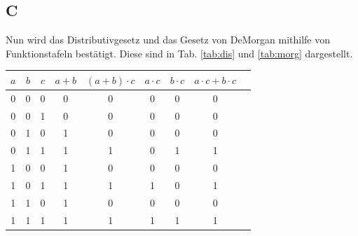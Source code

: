 \documentclass[10pt]{article}
\begin{document}
\begin{multicols}{2}
	\subsection*{C}
	Nun wird das Distributivgesetz und das Gesetz von DeMorgan mithilfe von Funktionstafeln bestätigt. Diese sind in Tab. \ref{tab:dis} und \ref{tab:morg} dargestellt.
	\begin{center}
		\begin{tabular}{|c|c|c|c|c|c|c|c|c|}
			\hline
			$a$ & $b$ & $c$ & $a + b$ & $(a + b) \cdot c$ & $a \cdot c$ & $b \cdot c$ & $a \cdot c + b \cdot c$ \\
			\hline
			0   & 0   & 0   & 0       & 0                 & 0           & 0           & 0                       \\
			0   & 0   & 1   & 0       & 0                 & 0           & 0           & 0                       \\
			0   & 1   & 0   & 1       & 0                 & 0           & 0           & 0                       \\
			0   & 1   & 1   & 1       & 1                 & 0           & 1           & 1                       \\
			1   & 0   & 0   & 1       & 0                 & 0           & 0           & 0                       \\
			1   & 0   & 1   & 1       & 1                 & 1           & 0           & 1                       \\
			1   & 1   & 0   & 1       & 0                 & 0           & 0           & 0                       \\
			1   & 1   & 1   & 1       & 1                 & 1           & 1           & 1                       \\
			\hline
		\end{tabular}


\end{center}
\end{multicols}
\end{document}
